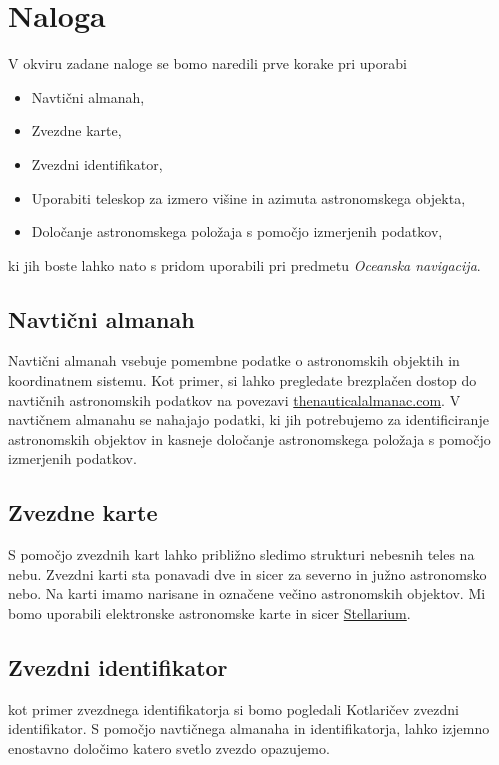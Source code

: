 \documentclass[11pt,a4]{article}
\begin{document}
\pagebreak

\section{Naloga}

V okviru zadane naloge se bomo naredili prve korake pri uporabi

\begin{itemize}
	\item Navtični almanah,
	\item Zvezdne karte,
	\item Zvezdni identifikator,
	\item Uporabiti teleskop za izmero višine in azimuta astronomskega objekta,
	\item Določanje astronomskega položaja s pomočjo izmerjenih podatkov,
\end{itemize}

ki jih boste lahko nato s pridom uporabili pri predmetu \textit{Oceanska navigacija}.

\subsection{Navtični almanah}
Navtični almanah vsebuje pomembne podatke o astronomskih objektih in koordinatnem sistemu. Kot primer, si lahko pregledate brezplačen dostop do navtičnih astronomskih podatkov na povezavi \href{https://thenauticalalmanac.com/}{thenauticalalmanac.com}. V navtičnem almanahu se nahajajo podatki, ki jih potrebujemo za identificiranje astronomskih objektov in kasneje določanje astronomskega položaja s pomočjo izmerjenih podatkov.

\subsection{Zvezdne karte}
S pomočjo zvezdnih kart lahko približno sledimo strukturi nebesnih teles na nebu. Zvezdni karti sta ponavadi dve in sicer za severno in južno astronomsko nebo. Na karti imamo narisane in označene večino astronomskih objektov. Mi bomo uporabili elektronske astronomske karte in sicer \href{http://www.stellarium.org/}{Stellarium}.

\subsection{Zvezdni identifikator} 
kot primer zvezdnega identifikatorja si bomo pogledali Kotlaričev zvezdni identifikator. S pomočjo navtičnega almanaha in identifikatorja, lahko izjemno enostavno določimo katero svetlo zvezdo opazujemo.
\end{document}
